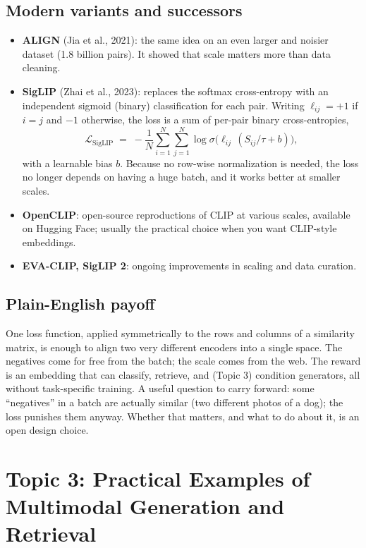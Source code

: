 \documentclass[11pt]{article}
\theoremstyle{remark}
\begin{document}
\subsection{Modern variants and successors}
\begin{itemize}[leftmargin=1.4em]
  \item \textbf{ALIGN} (Jia et al., 2021): the same idea on an even larger and noisier dataset (1.8 billion pairs). It showed that scale matters more than data cleaning.
  \item \textbf{SigLIP} (Zhai et al., 2023): replaces the softmax cross-entropy with an independent sigmoid (binary) classification for each pair. Writing $\ell_{ij} = +1$ if $i = j$ and $-1$ otherwise, the loss is a sum of per-pair binary cross-entropies,
  \[
  \mathcal{L}_{\text{SigLIP}} \;=\; -\frac{1}{N}\sum_{i=1}^{N}\sum_{j=1}^{N} \log \sigma\!\big(\ell_{ij}\,(S_{ij}/\tau + b)\big),
  \]
  with a learnable bias $b$. Because no row-wise normalization is needed, the loss no longer depends on having a huge batch, and it works better at smaller scales.
  \item \textbf{OpenCLIP}: open-source reproductions of CLIP at various scales, available on Hugging Face; usually the practical choice when you want CLIP-style embeddings.
  \item \textbf{EVA-CLIP, SigLIP 2}: ongoing improvements in scaling and data curation.
\end{itemize}

\subsection*{Plain-English payoff}
One loss function, applied symmetrically to the rows and columns of a similarity matrix, is enough to align two very different encoders into a single space. The negatives come for free from the batch; the scale comes from the web. The reward is an embedding that can classify, retrieve, and (Topic 3) condition generators, all without task-specific training. A useful question to carry forward: some ``negatives'' in a batch are actually similar (two different photos of a dog); the loss punishes them anyway. Whether that matters, and what to do about it, is an open design choice.

\section{Topic 3: Practical Examples of Multimodal Generation and Retrieval}
\end{document}
